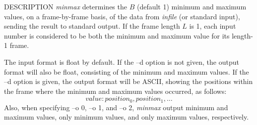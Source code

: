 \begin{synopsis}
 \item [minmax] [ --l $L$ ] [ --n $N$ ] [ --b $B$ ] [ --o $O$ ] [ --d ] [ {\em infile} ]
\end{synopsis}

\begin{qsection}{DESCRIPTION}
{\em minmax} determines the $B$ (default 1) minimum and maximum values, 
on a frame-by-frame basis, 
of the data from {\em infile} (or standard input), 
sending the result to standard output.
If the frame length $L$ is 1, 
each input number is considered to be both
the minimum and maximum value for its length-1 frame.

The input format is float by default.
If the --d option is not given, 
the output format will also be float,
consisting of the minimum and maximum values.
If the --d option is given,
the output format will be ASCII,
showing the positions within the frame 
where the minimum and maximum values occurred, as follows:
\begin{displaymath}
value:position_0,position_1,\dots
\end{displaymath}
Also, when specifying --o 0, --o 1, and --o 2,
{\em minmax} output minimum and maximum values, only minimum values, and
only maximum values, respectively.
\end{qsection}

\begin{options}
\end{options}


